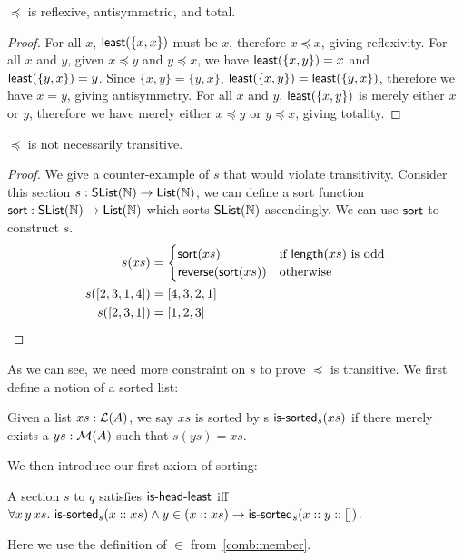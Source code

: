 \begin{proposition}
$\preccurlyeq$ is reflexive, antisymmetric, and total.
\end{proposition}
\begin{proof}
For all $x$, $\operatorname{\mathsf{least}}(\{x, x\})$ must be $x$, therefore $x \preccurlyeq x$, giving reflexivity.
For all $x$ and $y$, given $x \preccurlyeq y$ and $y \preccurlyeq x$,
we have $\operatorname{\mathsf{least}}(\{x, y\}) = x$ and $\operatorname{\mathsf{least}}(\{y, x\}) = y$.
Since $\{x, y\} = \{y, x\}$, $\operatorname{\mathsf{least}}(\{x, y\}) = \operatorname{\mathsf{least}}(\{y, x\})$,
therefore we have $x = y$, giving antisymmetry.
For all $x$ and $y$, $\operatorname{\mathsf{least}}(\{x, y\})$ is merely either $x$ or $y$,
therefore we have merely either $x \preccurlyeq y$ or $y \preccurlyeq x$, giving totality.
\end{proof}

\begin{proposition}
$\preccurlyeq$ is not necessarily transitive.
\end{proposition}
\begin{proof}
We give a counter-example of $s$ that would violate transitivity.
Consider this section $s : \operatorname{\mathsf{SList}}(\mathbb{N}) \to \operatorname{\mathsf{List}}(\mathbb{N})$, we can define a sort function
$\operatorname{\mathsf{sort}} : \operatorname{\mathsf{SList}}(\mathbb{N}) \to \operatorname{\mathsf{List}}(\mathbb{N})$ which sorts $\operatorname{\mathsf{SList}}(\mathbb{N})$ ascendingly. We can use $\operatorname{\mathsf{sort}}$
to construct $s$.
\begin{align*}
    s(xs) &= \begin{cases}
        \operatorname{\mathsf{sort}}(xs) & \text{if $\operatorname{\mathsf{length}}(xs)$ is odd} \\        
        \operatorname{\mathsf{reverse}}(\operatorname{\mathsf{sort}}(xs)) & \text{otherwise}
    \end{cases}\\
    s([2,3,1,4]) &= [4,3,2,1]\\
    s([2,3,1]) &= [1,2,3]
\end{align*}
\end{proof}

As we can see, we need more constraint on $s$ to prove $\preccurlyeq$ is transitive.
We first define a notion of a sorted list:
\begin{definition}
    Given a list $xs : \mathcal{L}(A)$, we say $xs$ is sorted by s $\operatorname{\mathsf{is-sorted}}_s(xs)$ if there merely exists
    a $ys : \mathcal{M}(A)$ such that $s(ys) = xs$.
\end{definition}

We then introduce our first axiom of sorting:
\begin{definition}
    A section $s$ to $q$ satisfies $\operatorname{\mathsf{is-head-least}}$ iff
    $\forall x\, y\, xs.\, \operatorname{\mathsf{is-sorted}}_s(x :: xs) \land y \in (x :: xs) \to \operatorname{\mathsf{is-sorted}}_s(x :: y :: [])$.
\end{definition}
Here we use the definition of $\in$ from~\ref{comb:member}.

